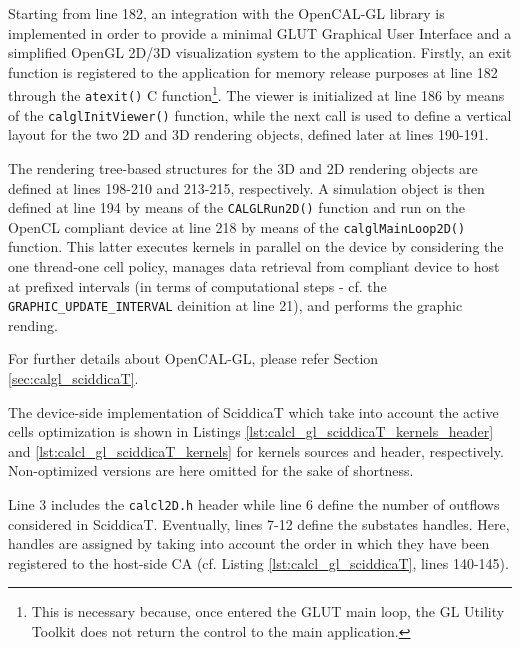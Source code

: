 Starting from line 182, an integration with the OpenCAL-GL library is
implemented in order to provide a minimal GLUT Graphical User
Interface and a simplified OpenGL 2D/3D visualization system to the
application. Firstly, an exit function is registered to the
application for memory release purposes at line 182 through the
\verb'atexit()' C function\footnote{This is necessary because, once
  entered the GLUT main loop, the GL Utility Toolkit does not return
  the control to the main application.}. The viewer is initialized at
line 186 by means of the \verb'calglInitViewer()' function, while the
next call is used to define a vertical layout for the two 2D and 3D
rendering objects, defined later at lines 190-191.

The rendering tree-based structures for the 3D and 2D rendering
objects are defined at lines 198-210 and 213-215, respectively. A
simulation object is then defined at line 194 by means of the
\verb'CALGLRun2D()' function and run on the OpenCL compliant device at
line 218 by means of the \verb'calglMainLoop2D()' function. This
latter executes kernels in parallel on the device by considering the
one thread-one cell policy, manages data retrieval from compliant
device to host at prefixed intervals (in terms of computational steps
- cf. the \verb'GRAPHIC_UPDATE_INTERVAL' deinition at line 21), and
performs the graphic rending.

For further details about OpenCAL-GL, please refer Section \ref{sec:calgl_sciddicaT}.





The device-side implementation of SciddicaT which take into account
the active cells optimization is shown in Listings
\ref{lst:calcl_gl_sciddicaT_kernels_header} and
\ref{lst:calcl_gl_sciddicaT_kernels} for kernels sources and header,
respectively. Non-optimized versions are here omitted for the sake of
shortness.

Line 3 includes the \verb'calcl2D.h' header while line 6 define the
number of outflows considered in SciddicaT. Eventually, lines 7-12
define the substates handles. Here, handles are assigned by taking
into account the order in which they have been registered to the
host-side CA (cf. Listing \ref{lst:calcl_gl_sciddicaT}, lines
140-145).

